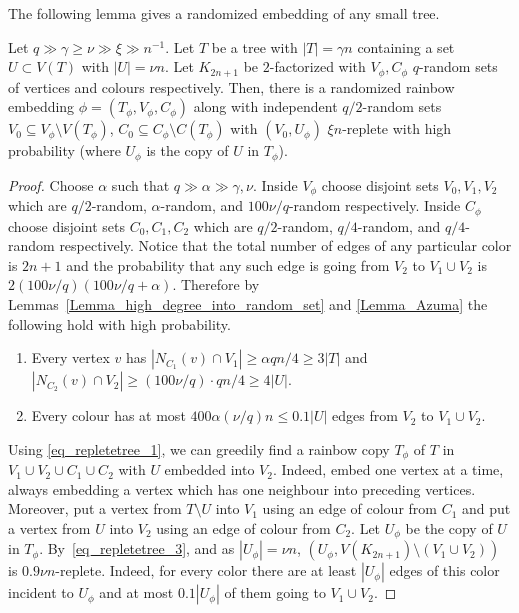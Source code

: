 The following lemma gives a randomized embedding of any small tree.
\begin{lemma} \label{Lemma_embedding_small_tree}
Let $q\gg \gamma\geq \nu \gg \xi \gg n^{-1}$.
Let $T$ be a tree with $|T|= \gamma n$ containing a set $U\subset V(T)$ with $|U|= \nu n$. Let $K_{2n+1}$ be $2$-factorized with $V_\phi, C_\phi$ $q$-random sets of vertices and colours respectively.
Then, there is a randomized rainbow embedding $\phi=(T_\phi, V_\phi, C_\phi)$ along with independent $q/2$-random sets $V_0\subseteq V_{\phi}\setminus V(T_{\phi})$,  $C_0\subseteq C_{\phi}\setminus C(T_{\phi})$    with $(V_0, U_\phi)$ $\xi n$-replete with high probability (where $U_\phi$ is the copy of $U$ in $T_\phi$).
\end{lemma}
\begin{proof}
Choose $\alpha$ such that $q\gg \alpha\gg \gamma, \nu$.
Inside $V_{\phi}$ choose disjoint sets $V_0, V_1, V_2$ which are $q/2$-random, $\alpha$-random, and $100\nu/q$-random respectively.
Inside $C_{\phi}$ choose disjoint sets  $C_0, C_1, C_2$ which are $q/2$-random, $q/4$-random, and $q/4$-random respectively. Notice that the total number of edges of any particular color is $2n+1$
and the probability that any such edge is going from $V_2$ to $V_1  \cup V_2$ is 
$2(100\nu/q)(100\nu/q+\alpha)$. Therefore by Lemmas~\ref{Lemma_high_degree_into_random_set} and \ref{Lemma_Azuma} the following hold with high probability.
\begin{enumerate}[label = {\bfseries \Alph{propcounter}\arabic{enumi}}]
    \item \label{eq_repletetree_1} Every vertex $v$ has $|N_{C_1}(v)\cap V_1|\geq \alpha q n/4\geq 3|T|$ and $|N_{C_2}(v)\cap V_2|\geq (100\nu/q)\cdot qn/4\geq 4|U|$.
 \item \label{eq_repletetree_3} Every colour has at most $400\alpha (\nu/q) n\leq 0.1|U|$ edges from $V_2$ to $V_1\cup V_2$.
\end{enumerate}
Using \ref{eq_repletetree_1}, we can greedily find a rainbow copy $T_\phi$ of $T$ in $V_1\cup V_2\cup C_1\cup C_2$ with $U$ embedded into $V_2$. Indeed,  embed one vertex at a time, always embedding a vertex which has one neighbour into preceding vertices. Moreover,  put a vertex from $T\setminus U$ into $V_1$ using an edge of colour from $C_1$ and put a vertex from $U$ into $V_2$ using an edge of colour from $C_2$.
Let $U_\phi$ be the copy of $U$ in $T_\phi$. By~\ref{eq_repletetree_3}, and as $|U_\phi|=\nu n$, $(U_\phi, V(K_{2n+1})\setminus (V_1\cup V_2))$ is  $0.9\nu n$-replete. Indeed, for every color there are at least $|U_\phi|$ edges of this color incident to $U_\phi$ and at most $0.1|U_\phi|$ of them going to $V_1 \cup V_2$.



\end{proof}
